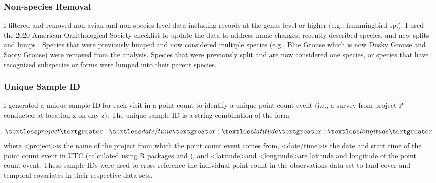 \subsubsection{Non-species Removal}
\par I filtered and removed non-avian and non-species level data including records at the genus level or higher (e.g., hummingbird sp.). I used the 2020 American Ornithological Society checklist to update the data to address name changes, recently described species, and new splits and lumps \citep{chesser_sixty-first_2020}. Species that were previously lumped and now considered multiple species (e.g., Blue Grouse which is now Dusky Grouse and Sooty Grouse) were removed from the analysis. Species that were previously split and are now considered one species, or species that have recognized subspecies or forms were lumped into their parent species. 

\subsubsection{Unique Sample ID}
\par I generated a unique sample ID for each visit in a point count to identify a unique point count event (i.e., a survey from project P conducted at location x on day z). The unique sample ID is a string combination of the form:

 $$\textless project\textgreater:\textless date/time\textgreater:\textless latitude\textgreater:\textless longitude\textgreater$$
 where \textless project\textgreater  is the name of the project from which the point count event comes from, \textless date/time\textgreater  is the date and start time of the point count event in UTC (calculated using R packages \citep{teucher_lutz_2019} and \citep{urbanek_proj4_2020}), and \textless latitude\textgreater  and \textless longitude\textgreater  are latitude and longitude of the point count event. These sample IDs were used to cross-reference the individual point count in the observations data set to land cover and temporal covariates in their respective data sets.

